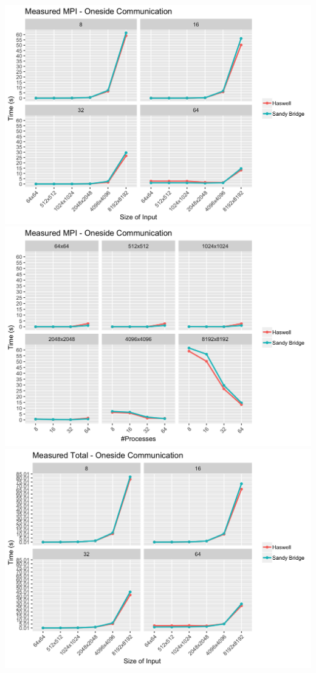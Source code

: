 \documentclass[10pt, letterpaper, twoside]{article}
\begin{document}
\begin{titlepage}
\begin{enumerate}
\vspace{10mm}
\includegraphics[scale = 0.18]{OS_Measured-MPI_Processes.png}
\includegraphics[scale = 0.18]{OS_Measured-MPI_InputSize.png}
\vspace{5mm}
\includegraphics[scale = 0.18]{OS_Measured-Total_Processes.png}

\end{enumerate}
\end{titlepage}
\end{document}
